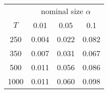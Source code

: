 % 
\begin{tabular}{cccc}
  \hline
  & \multicolumn{3}{c}{nominal size $\alpha$} \\
 $T$ & 0.01 & 0.05 & 0.1 \\
 \hline
250 & 0.004 & 0.022 & 0.082 \\ 
  350 & 0.007 & 0.031 & 0.067 \\ 
  500 & 0.011 & 0.056 & 0.086 \\ 
  1000 & 0.011 & 0.060 & 0.098 \\ 
   \hline
\end{tabular}
